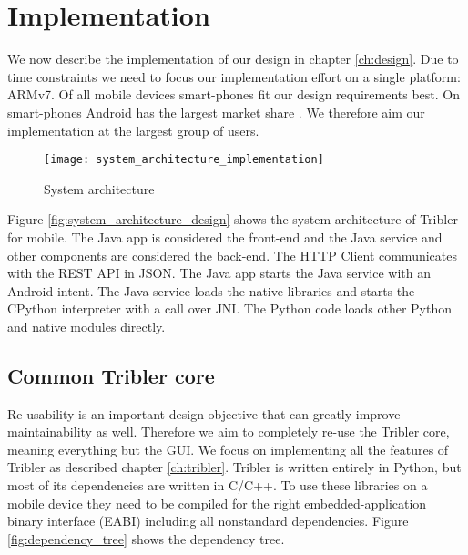 \chapter{Implementation}
\label{ch:implementation}

We now describe the implementation of our design in chapter \ref{ch:design}.
Due to time constraints we need to focus our implementation effort on a single platform: ARMv7.
Of all mobile devices smart-phones fit our design requirements best.
On smart-phones Android has the largest market share \cite{https://www.statista.com/statistics/266136/global-market-share-held-by-smartphone-operating-systems/}.
We therefore aim our implementation at the largest group of users.



\begin{figure}[H]
	\centering
	\texttt{[image: system\_architecture\_implementation]}
	\caption{System architecture}
	\label{fig:system_architecture_implementation}
\end{figure}




Figure \ref{fig:system_architecture_design} shows the system architecture of Tribler for mobile.
The Java app is considered the front-end and the Java service and other components are considered the back-end.
The HTTP Client communicates with the REST API in JSON.
The Java app starts the Java service with an Android intent.
The Java service loads the native libraries and starts the CPython interpreter with a call over JNI.
The Python code loads other Python and native modules directly.



\section{Common Tribler core}
Re-usability is an important design objective that can greatly improve maintainability as well.
Therefore we aim to completely re-use the Tribler core, meaning everything but the GUI.
We focus on implementing all the features of Tribler as described chapter \ref{ch:tribler}.
Tribler is written entirely in Python, but most of its dependencies are written in C/C++.
To use these libraries on a mobile device they need to be compiled for the right embedded-application binary interface (EABI) including all nonstandard dependencies.
Figure \ref{fig:dependency_tree} shows the dependency tree.

